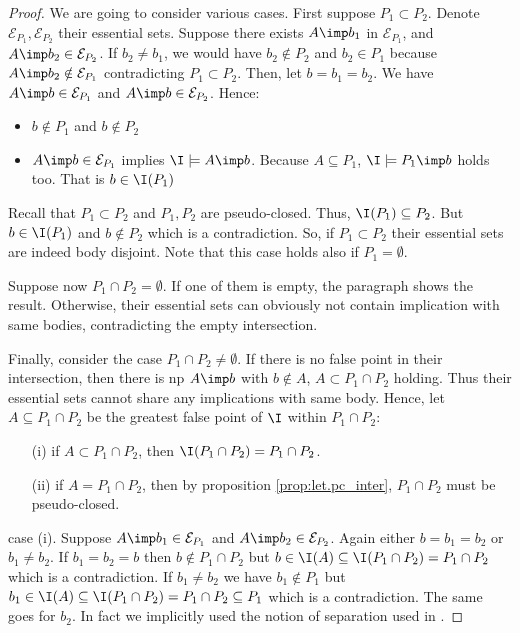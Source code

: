 \begin{proof} We are going to consider various cases. First suppose $P_1 
\subset P_2$. Denote $\mathcal{E}_{P_1}, \mathcal{E}_{P_2}$ their essential 
sets. Suppose there exists $A \imp b_1$ in $\mathcal{E}_{P_1}$, and $A \imp b_2 
\in \mathcal{E}_{P_2}$. If $b_2 \neq b_1$, we would have $b_2 \notin P_2$ and 
$b_2 \in P_1$ because $A \imp b_2 \notin \mathcal{E}_{P_1}$ contradicting $P_1 
\subset P_2$. Then, let $b = b_1 = b_2$. We have $A \imp b \in 
\mathcal{E}_{P_1}$ and $A \imp b \in \mathcal{E}_{P_2}$. Hence:
\begin{itemize}
	\item $b \notin P_1$ and $b \notin P_2$
	\item $A \imp b \in \mathcal{E}_{P_1}$ implies $\I \models A \imp b$. 
	Because 
	$A 
	\subseteq P_1$, $\I \models P_1 \imp b$ holds too. That is $b \in \I(P_1)$
\end{itemize}
\noindent Recall that $P_1 \subset P_2$ and $P_1, P_2$ are pseudo-closed. Thus,
$\I(P_1) \subseteq P_2$. But $b \in \I(P_1)$ and $b \notin P_2$ which is a 
contradiction. So, if $P_1 \subset P_2$ their essential sets are indeed body
disjoint. Note that this case holds also if $P_1 = \emptyset$.

\vspace{1.2em}

Suppose now $P_1 \cap P_2 = \emptyset$. If one of them is empty, the paragraph 
shows the result. Otherwise, their essential sets can obviously not contain 
implication with same bodies, contradicting the empty intersection. 

\vspace{1.2em}

Finally, consider the case $P_1 \cap P_2 \neq \emptyset$. If there is no false
point in their intersection, then there is np $A \imp b$ with $b \notin A$,
$A \subset P_1 \cap P_2$ holding. Thus their essential sets cannot share any
implications with same body. Hence, let $A \subseteq P_1 \cap P_2$ be the 
greatest false point of $\I$ within $P_1 \cap P_2$:
\begin{itemize}
	\item[(i)] if $A \subset P_1 \cap P_2$, then $\I(P_1 \cap P_2) = P_1 \cap 
	P_2$.
	\item[(ii)] if $A = P_1 \cap P_2$, then by proposition 
	\ref{prop:let.pc_inter}, $P_1 \cap P_2$ must be	pseudo-closed. 
\end{itemize}
\noindent case (i). Suppose $A \imp b_1 \in \mathcal{E}_{P_1}$ and $A \imp b_2
\in \mathcal{E}_{P_2}$. Again either $b = b_1 = b_2$ or $b_1 \neq b_2$. If $b_1 
= b_2 = b$ then $b \notin P_1 \cap P_2$ but $b \in \I(A) \subseteq \I(P_1 \cap 
P_2) = P_1 \cap P_2$ which is a contradiction. If $b_1 \neq b_2$ we have $b_1 
\notin P_1$ but $b_1 \in \I(A) \subseteq \I(P_1 \cap P_2) = P_1 \cap P_2 
\subseteq P_1$ which is a contradiction. The same goes for $b_2$. In fact we 
implicitly used the notion of separation used in \cite{berczi_directed_2017}.


\end{proof}
